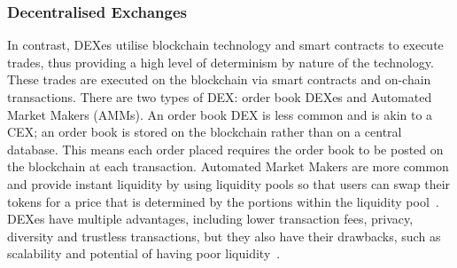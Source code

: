 \subsubsection{Decentralised Exchanges}
In contrast, DEXes utilise blockchain technology and smart contracts to execute trades, thus providing a high level of determinism by nature of the technology. These trades are executed on the blockchain via smart contracts and on-chain transactions. There are two types of DEX: order book DEXes and Automated Market Makers (AMMs). An order book DEX is less common and is akin to a CEX; an order book is stored on the blockchain rather than on a central database. This means each order placed requires the order book to be posted on the blockchain at each transaction. Automated Market Makers are more common and provide instant liquidity by using liquidity pools so that users can swap their tokens for a price that is determined by the portions within the liquidity pool~\cite{DEXes}. DEXes have multiple advantages, including lower transaction fees, privacy, diversity and trustless transactions, but they also have their drawbacks, such as scalability and potential of having poor liquidity~\cite{DEXvsCEX}.

